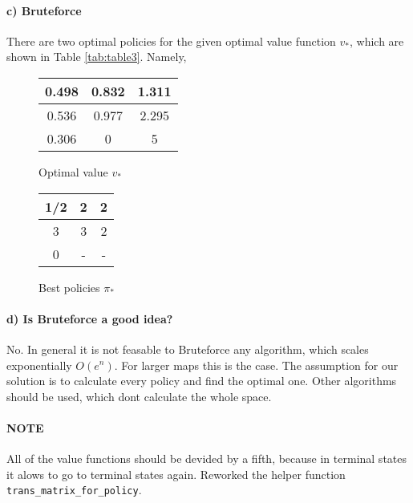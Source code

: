 \documentclass{article}
\begin{document}
\paragraph*{c) Bruteforce}

There are two optimal policies for the given optimal value function $v_*$, which are shown in Table \ref{tab:table3}. Namely, 

\begin{figure}[H]
\begin{minipage}{0.45\textwidth}
    \centering
    \begin{tabular}{c|c|c}
    0.498 & 0.832 & 1.311 \\ \hline
    0.536 & 0.977 & 2.295 \\ \hline                 
    0.306 & 0 & 5 \\
    \end{tabular}
    \caption{Optimal value $v_*$}
    \label{tab:table3}
\end{minipage}
\begin{minipage}{0.45\textwidth}
    \centering
    \begin{tabular}{c|c|c}
     1/2 & 2 & 2 \\ \hline
     3 & 3 & 2 \\ \hline
     0 & - & -
    \end{tabular}
    \caption{Best policies $\pi_*$}
    \label{tab:bestPol}
\end{minipage}    
\end{figure}






\paragraph*{d) Is Bruteforce a good idea?}

No. In general it is not feasable to Bruteforce any algorithm, which scales exponentially $O(e^n)$. For larger maps this is the case. The assumption for our solution is to calculate every policy and find the optimal one. Other algorithms should be used, which dont calculate the whole space. 

\paragraph*{NOTE}
All of the value functions should be devided by a fifth, because in terminal states it alows to go to terminal states again. Reworked the helper function \texttt{trans\_matrix\_for\_policy}.
\end{document}
